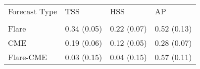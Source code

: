 \begin{tabular}{llll}
\toprule
Forecast Type & TSS & HSS & AP \\
 &  &  &  \\
\midrule
Flare & 0.34 (0.05) & 0.22 (0.07) & 0.52 (0.13) \\
CME & 0.19 (0.06) & 0.12 (0.05) & 0.28 (0.07) \\
Flare-CME & 0.03 (0.15) & 0.04 (0.15) & 0.57 (0.11) \\
\bottomrule
\end{tabular}
